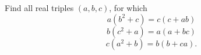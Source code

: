 Find all real triples $(a,b,c)$, for which $$a(b^2+c)=c(c+ab)$$ $$b(c^2+a)=a(a+bc)$$ $$c(a^2+b)=b(b+ca).$$